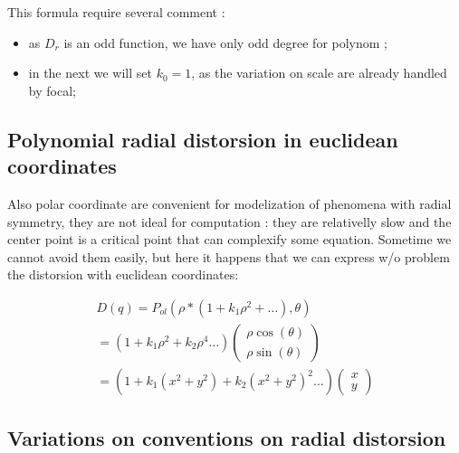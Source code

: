 This formula require several comment :

\begin{itemize}
    \item  as $D_r$ is an odd function, we have only odd degree for polynom ; 

    \item  in the next we will set $k_0=1$, as the variation on scale are already handled by focal;
\end{itemize}


\subsection{Polynomial radial distorsion in euclidean coordinates}

Also polar coordinate are convenient for modelization of phenomena with radial symmetry, 
they are not ideal for computation : they are relativelly slow and  the center point is
a critical point that can complexify some equation.  Sometime we cannot avoid them
easily, but here it happens that we can express w/o problem the distorsion
with euclidean coordinates:

\begin{equation}
\begin{multlined}
D(q)  =   P_{ol}(\rho  * (1 + k_1 \rho^ 2 + \dots) ,\theta)  \\
=   (1 + k_1 \rho^ 2 +  k_2 \rho^ 4 \dots)  \begin{pmatrix} \rho\cos(\theta) \\ \rho \sin(\theta) \end{pmatrix} \\
=   (1 + k_1 (x^2+y^2) +  k_2 (x^2+y^2) ^2 \dots)  \begin{pmatrix} x \\ y \end{pmatrix}
\end{multlined}
	\label{PolDistEucl}
\end{equation}




\subsection{Variations on  conventions on radial distorsion}

